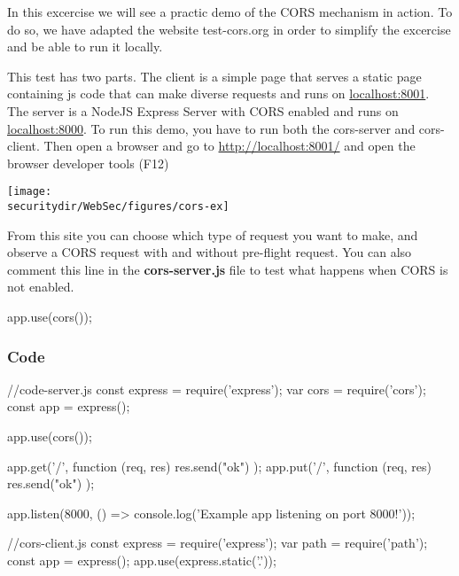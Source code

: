 \begin{Exercise}[label={websec-cors-practs}]
	In this excercise we will see a practic demo of the CORS mechanism in action. To do so, we have adapted the website test-cors.org in order to simplify the excercise and be able to run it locally. 
	
	This test has two parts. The client is a simple page that serves a static page containing js code that can make diverse requests and runs on \url{localhost:8001}. The server is a NodeJS Express Server with CORS enabled and runs on \url{localhost:8000}. To run this demo, you have to run both the cors-server and cors-client. Then open a browser and go to \url{http://localhost:8001/} and open the browser developer tools (F12)
	
    \begin{centering}
      \texttt{[image: \\securitydir/WebSec/figures/cors-ex]}
      \par\end{centering}
  
	From this site you can choose which type of request you want to make, and observe a CORS request with and without pre-flight request. 
	You can also comment this line in the \textbf{cors-server.js} file to test what happens when CORS is not enabled.
	\begin{js}app.use(cors());\end{js}
  
  \subsubsection{Code}
  \begin{js}
//code-server.js
const express = require('express');
var cors = require('cors');
const app = express();

app.use(cors());

app.get('/', function (req, res) {
  res.send("ok")
});
app.put('/', function (req, res) {
  res.send("ok")
});

app.listen(8000, () => console.log('Example app listening on port 8000!'));
\end{js}

\begin{js}
 //cors-client.js
const express = require('express');
var path = require('path');
const app = express();
app.use(express.static('.'));


\end{js}
\end{Exercise}

